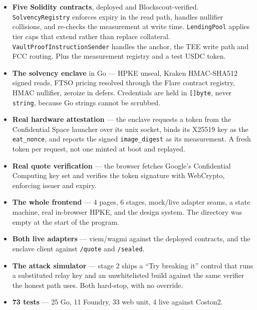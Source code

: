 \documentclass[11pt,a4paper]{article}
\newcommand{\code}[1]{\texttt{\small #1}}
\newcommand{\TestsTotal}{73}
\newcommand{\TestsGo}{25}
\newcommand{\TestsFoundry}{11}
\newcommand{\TestsWeb}{33}
\newcommand{\TestsLive}{4}
\begin{document}
\begin{itemize}[leftmargin=1.2em, itemsep=0.45em]
  \item \textbf{Five Solidity contracts}, deployed and Blockscout-verified.
        \code{SolvencyRegistry} enforces expiry in the read path, handles
        nullifier collisions, and re-checks the measurement at write time.
        \code{LendingPool} applies tier caps that extend rather than replace
        collateral. \code{VaultProofInstructionSender} handles the anchor, the
        TEE write path and FCC routing. Plus the measurement registry and a
        test USDC token.

  \item \textbf{The solvency enclave} in Go --- HPKE unseal, Kraken
        HMAC-SHA512 signed reads, FTSO pricing resolved through the Flare
        contract registry, HMAC nullifier, zeroize in defers. Credentials are
        held in \code{[]byte}, never \code{string}, because Go strings cannot
        be scrubbed.

  \item \textbf{Real hardware attestation} --- the enclave requests a token
        from the Confidential Space launcher over its unix socket, binds its
        X25519 key as the \code{eat\_nonce}, and reports the signed
        \code{image\_digest} as its measurement. A fresh token per request,
        not one minted at boot and replayed.

  \item \textbf{Real quote verification} --- the browser fetches Google's
        Confidential Computing key set and verifies the token signature with
        WebCrypto, enforcing issuer and expiry.

  \item \textbf{The whole frontend} --- 4 pages, 6 stages, mock/live adapter
        seams, a state machine, real in-browser HPKE, and the design system.
        The directory was empty at the start of the program.

  \item \textbf{Both live adapters} --- viem/wagmi against the deployed
        contracts, and the enclave client against \code{/quote} and
        \code{/sealed}.

  \item \textbf{The attack simulator} --- stage 2 ships a ``Try breaking it''
        control that runs a substituted relay key and an unwhitelisted build
        against the same verifier the honest path uses. Both hard-stop, with
        no override.

  \item \textbf{\TestsTotal{} tests} --- \TestsGo{} Go, \TestsFoundry{}
        Foundry, \TestsWeb{} web unit, \TestsLive{} live against Coston2.
\end{itemize}
\end{document}
